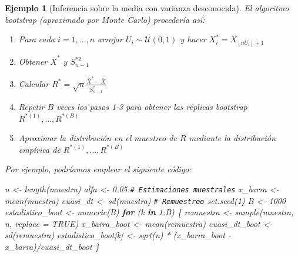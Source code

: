 \documentclass[
]{book}
\newenvironment{Shaded}{\begin{snugshade}}{\end{snugshade}}
\newcommand{\AttributeTok}[1]{\textcolor[rgb]{0.77,0.63,0.00}{#1}}
\newcommand{\CommentTok}[1]{\textcolor[rgb]{0.56,0.35,0.01}{\textit{#1}}}
\newcommand{\ConstantTok}[1]{\textcolor[rgb]{0.00,0.00,0.00}{#1}}
\newcommand{\ControlFlowTok}[1]{\textcolor[rgb]{0.13,0.29,0.53}{\textbf{#1}}}
\newcommand{\DecValTok}[1]{\textcolor[rgb]{0.00,0.00,0.81}{#1}}
\newcommand{\FloatTok}[1]{\textcolor[rgb]{0.00,0.00,0.81}{#1}}
\newcommand{\FunctionTok}[1]{\textcolor[rgb]{0.00,0.00,0.00}{#1}}
\newcommand{\NormalTok}[1]{#1}
\newcommand{\OtherTok}[1]{\textcolor[rgb]{0.56,0.35,0.01}{#1}}
\newcommand{\SpecialCharTok}[1]{\textcolor[rgb]{0.00,0.00,0.00}{#1}}
\theoremstyle{break}
\newtheorem{example}{Ejemplo}[chapter]
\theoremstyle{nonumberplain}
\renewcommand{\CommentTok}[1]{\textcolor[rgb]{0.41,0.41,0.41}{\texttt{#1}}}
\begin{document}
\begin{example}[Inferencia sobre la media con varianza desconocida]
El algoritmo bootstrap (aproximado por Monte Carlo) procedería así:

\begin{enumerate}
\def\labelenumi{\arabic{enumi}.}
\item
  Para cada \(i=1,\ldots ,n\) arrojar \(U_i\sim \mathcal{U}\left( 0,1 \right)\) y
  hacer \(X_i^{\ast}=X_{\left\lfloor nU_i\right\rfloor +1}\)
\item
  Obtener \(\bar{X}^{\ast}\) y \(S_{n-1}^{\ast 2}\)
\item
  Calcular
  \(R^{\ast}=\sqrt{n}\frac{\bar{X}^{\ast}-\bar{X}}{ S_{n-1}^{\ast}}\)
\item
  Repetir \(B\) veces los pasos 1-3 para obtener las réplicas bootstrap
  \(R^{\ast (1)}, \ldots, R^{\ast (B)}\)
\item
  Aproximar la distribución en el muestreo de \(R\) mediante la
  distribución empírica de \(R^{\ast (1)}, \ldots, R^{\ast (B)}\)
\end{enumerate}

Por ejemplo, podríamos emplear el siguiente código:

\begin{Shaded}
\begin{Highlighting}[]
\NormalTok{n }\OtherTok{\textless{}{-}} \FunctionTok{length}\NormalTok{(muestra)}
\NormalTok{alfa }\OtherTok{\textless{}{-}} \FloatTok{0.05}
\CommentTok{\# Estimaciones muestrales}
\NormalTok{x\_barra }\OtherTok{\textless{}{-}} \FunctionTok{mean}\NormalTok{(muestra)}
\NormalTok{cuasi\_dt }\OtherTok{\textless{}{-}} \FunctionTok{sd}\NormalTok{(muestra)}
\CommentTok{\# Remuestreo}
\FunctionTok{set.seed}\NormalTok{(}\DecValTok{1}\NormalTok{)}
\NormalTok{B }\OtherTok{\textless{}{-}} \DecValTok{1000}
\NormalTok{estadistico\_boot }\OtherTok{\textless{}{-}} \FunctionTok{numeric}\NormalTok{(B)}
\ControlFlowTok{for}\NormalTok{ (k }\ControlFlowTok{in} \DecValTok{1}\SpecialCharTok{:}\NormalTok{B) \{}
\NormalTok{  remuestra }\OtherTok{\textless{}{-}} \FunctionTok{sample}\NormalTok{(muestra, n, }\AttributeTok{replace =} \ConstantTok{TRUE}\NormalTok{)}
\NormalTok{  x\_barra\_boot }\OtherTok{\textless{}{-}} \FunctionTok{mean}\NormalTok{(remuestra)}
\NormalTok{  cuasi\_dt\_boot }\OtherTok{\textless{}{-}} \FunctionTok{sd}\NormalTok{(remuestra)}
\NormalTok{  estadistico\_boot[k] }\OtherTok{\textless{}{-}} \FunctionTok{sqrt}\NormalTok{(n) }\SpecialCharTok{*}\NormalTok{ (x\_barra\_boot }\SpecialCharTok{{-}}\NormalTok{ x\_barra)}\SpecialCharTok{/}\NormalTok{cuasi\_dt\_boot}
\NormalTok{\}}
\end{Highlighting}
\end{Shaded}


\end{example}
\end{document}
